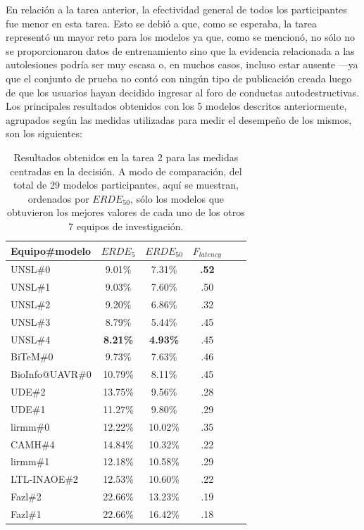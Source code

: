 En relación a la tarea anterior, la efectividad general de todos los participantes fue menor en esta tarea.
Esto se debió a que, como se esperaba, la tarea representó un mayor reto para los modelos ya que, como se mencionó, no sólo no se proporcionaron datos de entrenamiento sino que la evidencia relacionada a las autolesiones podría ser muy escasa o, en muchos casos, incluso estar ausente ---ya que el conjunto de prueba no contó con ningún tipo de publicación creada luego de que los usuarios hayan decidido ingresar al foro de conductas autodestructivas.
Los principales resultados obtenidos con los 5 modelos descritos anteriormente, agrupados según las medidas utilizadas para medir el desempeño de los mismos, son los siguientes:


\begin{table}[t!]
\centering
\caption{Resultados obtenidos en la tarea 2 para las medidas centradas en la decisión. A modo de comparación, del total de 29 modelos participantes, aquí se muestran, ordenados por $ERDE_{50}$, sólo los modelos que obtuvieron los mejores valores de cada uno de los otros 7 equipos de investigación.}
\label{tab:t2-result}
\begin{tabular}{l c c c c c}
\hline
Equipo\#modelo & $ERDE_5$ & $ERDE_{50}$ & $F_{latency}$ \\ \hline

UNSL\#0 & 9.01\% & 7.31\% & \textbf{.52} \\
UNSL\#1 & 9.03\% & 7.60\% & .50 \\
UNSL\#2 & 9.20\% & 6.86\% & .32 \\
UNSL\#3 & 8.79\% & 5.44\% & .45 \\
UNSL\#4 & \textbf{8.21\%} & \textbf{4.93\%} & .45 \\
\hline
\hline
BiTeM\#0 & 9.73\% & 7.63\% & .46 \\
BioInfo@UAVR\#0 & 10.79\% & 8.11\% & .45 \\
UDE\#2 & 13.75\% & 9.56\% & .28 \\
UDE\#1 & 11.27\% & 9.80\% & .29 \\
lirmm\#0 & 12.22\% & 10.02\% & .35 \\
CAMH\#4 & 14.84\% & 10.32\% & .22 \\
lirmm\#1 & 12.18\% & 10.58\% & .29 \\
LTL-INAOE\#2 & 12.53\% & 10.60\% & .22 \\
Fazl\#2 & 22.66\% & 13.23\% & .19 \\
Fazl\#1 & 22.66\% & 16.42\% & .18 \\
\hline

\end{tabular}
\end{table}

